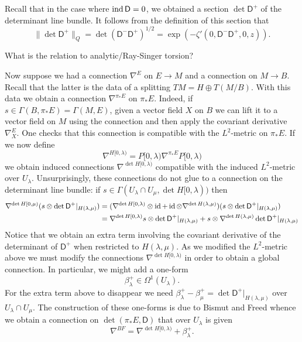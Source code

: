 \documentclass{amsart}
\renewcommand\d{\mathsf{D}}
\begin{document}
Recall that in the case where $\ind\d=0$, we obtained a section $\det\d^+$ of the determinant
line bundle. It follows from the definition of this section that
\begin{equation*}
    \lVert \det\d^+\rVert_Q = \det(\d^-\d^+)^{1/2} = \exp(-\zeta'(0,\d^-\d^+,0,z)).
\end{equation*}

\begin{exercise}
    What is the relation to analytic/Ray-Singer torsion?
\end{exercise}

Now suppose we had a connection $\nabla^E$ on $E\to M$ and a connection on $M\to B$.
Recall that the latter is the data of a splitting $TM=H\oplus T(M/B)$. With this data
we obtain a connection $\nabla^{\pi_*E}$ on $\pi_*E$. Indeed, if
$s\in\Gamma(B,\pi_*E)=\Gamma(M,E)$, given a vector field $X$ on $B$ we can lift it to a
vector field on $M$ using the connection and then apply the covariant derivative $\nabla^E_X$.
One checks that this connection is compatible with the $L^2$-metric on $\pi_*E$.
If we now define
\begin{equation*}
    \nabla^{H[0,\lambda)} = P[0,\lambda)\nabla^{\pi_*E}P[0,\lambda)
\end{equation*}
we obtain induced connections $\nabla^{\det H[0,\lambda)}$ compatible with the induced
$L^2$-metric over $U_\lambda$. Unsurprisingly, these connections do not glue to a connection
on the determinant line bundle: if $s\in\Gamma(U_\lambda\cap U_\mu,\det H[0,\lambda))$ then
\begin{align*}
    \nabla^{\det H[0,\mu)} (s\otimes \det \d^+|_{H(\lambda,\mu)}) &=
        (\nabla^{\det H[0,\lambda)}\otimes \id + \id\otimes\nabla^{\det H(\lambda,\mu)})
            (s\otimes\det\d^+|_{H(\lambda,\mu)})\\
            &= \nabla^{\det H[0,\lambda)}s\otimes\det\d^+|_{H(\lambda,\mu)} + s\otimes\nabla^{\det H(\lambda,\mu)}\det\d^+|_{H(\lambda,\mu)}
\end{align*}
Notice that we obtain an extra term involving the covariant derivative of the
determinant of $\d^+$ when restricted to $H(\lambda,\mu)$.
As we modified the $L^2$-metric above we must modify the connections $\nabla^{\det H[0,\lambda)}$
in order to obtain a global connection. In particular, we might add a one-form
\begin{equation*}
    \beta_\lambda^+ \in \Omega^1(U_\lambda).
\end{equation*}
For the extra term above to disappear we need $\beta_\lambda^+ - \beta_\mu^+=\det\d^+|_{H(\lambda,\mu)}$
over $U_\lambda\cap U_\mu$. The construction of these one-forms is due to Bismut and Freed
whence we obtain a connection on $\det(\pi_*E,\d)$ that over $U_\lambda$ is given
\begin{equation*}
    \nabla^{BF} = \nabla^{\det H[0,\lambda)} + \beta_\lambda^+.
\end{equation*}
\end{document}
